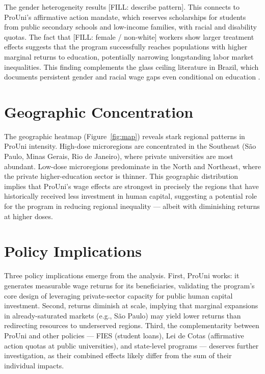 The gender heterogeneity results [FILL: describe pattern]. This connects to ProUni's affirmative action mandate, which reserves scholarships for students from public secondary schools and low-income families, with racial and disability quotas. The fact that [FILL: female / non-white] workers show larger treatment effects suggests that the program successfully reaches populations with higher marginal returns to education, potentially narrowing longstanding labor market inequalities. This finding complements the glass ceiling literature in Brazil, which documents persistent gender and racial wage gaps even conditional on education .

\section{Geographic Concentration}
\label{sec:geography}

The geographic heatmap (Figure~\ref{fig:map}) reveals stark regional patterns in ProUni intensity. High-dose microregions are concentrated in the Southeast (S\~{a}o Paulo, Minas Gerais, Rio de Janeiro), where private universities are most abundant. Low-dose microregions predominate in the North and Northeast, where the private higher-education sector is thinner. This geographic distribution implies that ProUni's wage effects are strongest in precisely the regions that have historically received less investment in human capital, suggesting a potential role for the program in reducing regional inequality --- albeit with diminishing returns at higher doses.

\section{Policy Implications}
\label{sec:policy}

Three policy implications emerge from the analysis. First, ProUni works: it generates measurable wage returns for its beneficiaries, validating the program's core design of leveraging private-sector capacity for public human capital investment. Second, returns diminish at scale, implying that marginal expansions in already-saturated markets (e.g., S\~{a}o Paulo) may yield lower returns than redirecting resources to underserved regions. Third, the complementarity between ProUni and other policies --- FIES (student loans), Lei de Cotas (affirmative action quotas at public universities), and state-level programs --- deserves further investigation, as their combined effects likely differ from the sum of their individual impacts.


